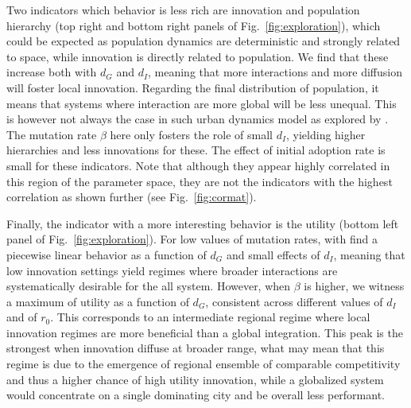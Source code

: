 \documentclass[letterpaper]{article}
\begin{document}
Two indicators which behavior is less rich are innovation and population hierarchy (top right and bottom right panels of Fig.~\ref{fig:exploration}), which could be expected as population dynamics are deterministic and strongly related to space, while innovation is directly related to population. We find that these increase both with $d_G$ and $d_I$, meaning that more interactions and more diffusion will foster local innovation. Regarding the final distribution of population, it means that systems where interaction are more global will be less unequal. This is however not always the case in such urban dynamics model as explored by \cite{raimbault2020hierarchy}. The mutation rate $\beta$ here only fosters the role of small $d_I$, yielding higher hierarchies and less innovations for these. The effect of initial adoption rate is small for these indicators. Note that although they appear highly correlated in this region of the parameter space, they are not the indicators with the highest correlation as shown further (see Fig.~\ref{fig:cormat}).

Finally, the indicator with a more interesting behavior is the utility (bottom left panel of Fig.~\ref{fig:exploration}). For low values of mutation rates, with find a piecewise linear behavior as a function of $d_G$ and small effects of $d_I$, meaning that low innovation settings yield regimes where broader interactions are systematically desirable for the all system. However, when $\beta$ is higher, we witness a maximum of utility as a function of $d_G$, consistent across different values of $d_I$ and of $r_0$. This corresponds to an intermediate regional regime where local innovation regimes are more beneficial than a global integration. This peak is the strongest when innovation diffuse at broader range, what may mean that this regime is due to the emergence of regional ensemble of comparable competitivity and thus a higher chance of high utility innovation, while a globalized system would concentrate on a single dominating city and be overall less performant.
\end{document}
